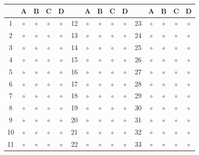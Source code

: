 \documentclass[11pt,a4paper]{article}
\begin{document}
\begin{center}
\renewcommand{\arraystretch}{1.35}
\small
\begin{tabular}{c|cccc@{\qquad}c|cccc@{\qquad}c|cccc}
 & A & B & C & D & & A & B & C & D & & A & B & C & D\\ \hline
1 & \(\circ\) & \(\circ\) & \(\circ\) & \(\circ\) &
12 & \(\circ\) & \(\circ\) & \(\circ\) & \(\circ\) &
23 & \(\circ\) & \(\circ\) & \(\circ\) & \(\circ\)\\
2 & \(\circ\) & \(\circ\) & \(\circ\) & \(\circ\) &
13 & \(\circ\) & \(\circ\) & \(\circ\) & \(\circ\) &
24 & \(\circ\) & \(\circ\) & \(\circ\) & \(\circ\)\\
3 & \(\circ\) & \(\circ\) & \(\circ\) & \(\circ\) &
14 & \(\circ\) & \(\circ\) & \(\circ\) & \(\circ\) &
25 & \(\circ\) & \(\circ\) & \(\circ\) & \(\circ\)\\
4 & \(\circ\) & \(\circ\) & \(\circ\) & \(\circ\) &
15 & \(\circ\) & \(\circ\) & \(\circ\) & \(\circ\) &
26 & \(\circ\) & \(\circ\) & \(\circ\) & \(\circ\)\\
5 & \(\circ\) & \(\circ\) & \(\circ\) & \(\circ\) &
16 & \(\circ\) & \(\circ\) & \(\circ\) & \(\circ\) &
27 & \(\circ\) & \(\circ\) & \(\circ\) & \(\circ\)\\
6 & \(\circ\) & \(\circ\) & \(\circ\) & \(\circ\) &
17 & \(\circ\) & \(\circ\) & \(\circ\) & \(\circ\) &
28 & \(\circ\) & \(\circ\) & \(\circ\) & \(\circ\)\\
7 & \(\circ\) & \(\circ\) & \(\circ\) & \(\circ\) &
18 & \(\circ\) & \(\circ\) & \(\circ\) & \(\circ\) &
29 & \(\circ\) & \(\circ\) & \(\circ\) & \(\circ\)\\
8 & \(\circ\) & \(\circ\) & \(\circ\) & \(\circ\) &
19 & \(\circ\) & \(\circ\) & \(\circ\) & \(\circ\) &
30 & \(\circ\) & \(\circ\) & \(\circ\) & \(\circ\)\\
9 & \(\circ\) & \(\circ\) & \(\circ\) & \(\circ\) &
20 & \(\circ\) & \(\circ\) & \(\circ\) & \(\circ\) &
31 & \(\circ\) & \(\circ\) & \(\circ\) & \(\circ\)\\
10 & \(\circ\) & \(\circ\) & \(\circ\) & \(\circ\) &
21 & \(\circ\) & \(\circ\) & \(\circ\) & \(\circ\) &
32 & \(\circ\) & \(\circ\) & \(\circ\) & \(\circ\)\\
11 & \(\circ\) & \(\circ\) & \(\circ\) & \(\circ\) &
22 & \(\circ\) & \(\circ\) & \(\circ\) & \(\circ\) &
33 & \(\circ\) & \(\circ\) & \(\circ\) & \(\circ\)
\end{tabular}
\end{center}
\end{document}
